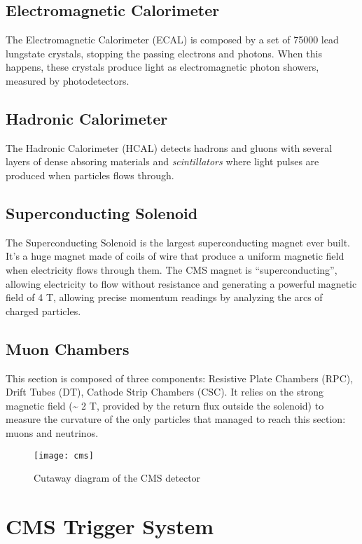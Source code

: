 \subsection{Electromagnetic Calorimeter}

The Electromagnetic Calorimeter (ECAL) is composed by a set of 75000 lead lungstate crystals, stopping the passing electrons and photons. When this happens, these crystals produce light as electromagnetic photon showers, measured by photodetectors.


\subsection{Hadronic Calorimeter}

The Hadronic Calorimeter (HCAL) detects hadrons and gluons with several layers of dense absoring materials and \textit{scintillators} where light pulses are produced when particles flows through.

\subsection{Superconducting Solenoid}

The Superconducting Solenoid is the largest superconducting magnet ever built. It's a huge magnet made of coils of wire that produce a uniform magnetic field when electricity flows through them. The CMS magnet is “superconducting”, allowing electricity to flow without resistance and generating a powerful magnetic field of 4 T, allowing precise momentum readings by analyzing the arcs of charged particles.

\subsection{Muon Chambers}

This section is composed of three components: Resistive Plate Chambers (RPC), Drift Tubes (DT), Cathode Strip Chambers (CSC). It relies on the strong magnetic field (\~{} 2 T, provided by the return flux outside the solenoid) to measure the curvature of the only particles that managed to reach this section: muons and neutrinos.


\begin{figure}
	\centerline{
		\texttt{[image: cms]}}
	\caption{Cutaway diagram of the CMS detector \cite{Sakuma_2014}}
	\label{fig:cms}
\end{figure}

\section{CMS Trigger System}


